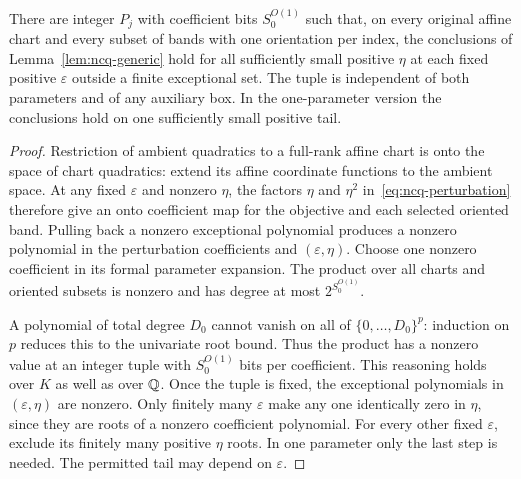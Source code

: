 \begin{lemma}
\label{lem:ncq-perturbation}
There are integer $P_j$ with coefficient bits $S_0^{O(1)}$ such that,
on every original affine chart and every subset of bands with one
orientation per index, the conclusions of Lemma~\ref{lem:ncq-generic}
hold for all sufficiently small positive $\eta$ at each fixed positive
$\varepsilon$ outside a finite exceptional set. The tuple is independent
of both parameters and of any auxiliary box. In the one-parameter version
the conclusions hold on one sufficiently small positive tail.
\end{lemma}

\begin{proof}
Restriction of ambient quadratics to a full-rank affine chart is onto the
space of chart quadratics: extend its affine coordinate functions to the
ambient space. At any fixed $\varepsilon$ and nonzero $\eta$, the factors
$\eta$ and $\eta^2$ in~\eqref{eq:ncq-perturbation} therefore give an
onto coefficient map for the objective and each selected oriented band.
Pulling back a nonzero exceptional polynomial produces a nonzero polynomial
in the perturbation coefficients and $(\varepsilon,\eta)$. Choose one
nonzero coefficient in its formal parameter expansion. The product over
all charts and oriented subsets is nonzero and has degree at most
$2^{S_0^{O(1)}}$.

A polynomial of total degree $D_0$ cannot vanish on all of
$\{0,\ldots,D_0\}^p$: induction on $p$ reduces this to the univariate
root bound. Thus the product has a nonzero value at an integer tuple with
$S_0^{O(1)}$ bits per coefficient. This reasoning holds over $K$ as well
as over $\mathbb Q$. Once the tuple is fixed, the exceptional polynomials in
$(\varepsilon,\eta)$ are nonzero. Only finitely many $\varepsilon$ make
any one identically zero in $\eta$, since they are roots of a nonzero
coefficient polynomial. For every other fixed $\varepsilon$, exclude its
finitely many positive $\eta$ roots. In one parameter only the last step
is needed. The permitted tail may depend on $\varepsilon$.
\end{proof}

